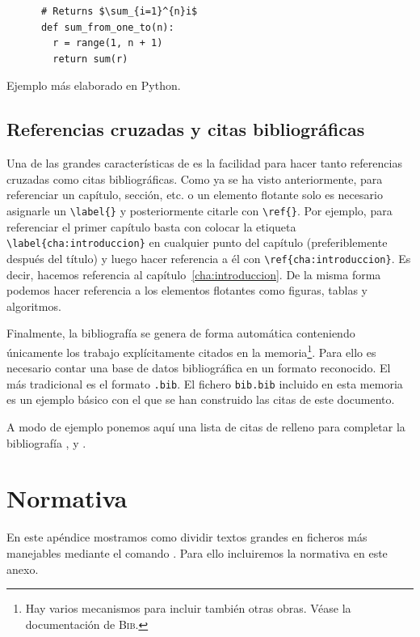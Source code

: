 \documentclass{DeustoFDP}
\begin{document}
\begin{listing}\centering
  \begin{minipage}{.4\textwidth}
    \begin{verbatim}
      # Returns $\sum_{i=1}^{n}i$
      def sum_from_one_to(n):
        r = range(1, n + 1)
        return sum(r)
    \end{verbatim}
  \end{minipage}
  \caption{Ejemplo m\'as elaborado en Python.}\label{lst:python}
\end{listing}

\section{Referencias cruzadas y citas bibliogr\'aficas}

Una de las grandes caracter\'isticas de  es la facilidad para
hacer tanto referencias cruzadas como citas bibliogr\'aficas. Como ya se ha
visto anteriormente, para referenciar un cap\'itulo, secci\'on, etc. o
un elemento flotante solo es necesario asignarle un \verb+\label{}+ y
posteriormente citarle con \verb+\ref{}+. Por ejemplo, para referenciar
el primer cap\'itulo basta con colocar la etiqueta
\verb+\label{cha:introduccion}+ en cualquier punto del cap\'itulo
(preferiblemente despu\'es del t\'itulo) y luego hacer referencia a \'el
con \verb+\ref{cha:introduccion}+. Es decir, hacemos referencia al
cap\'itulo~\ref{cha:introduccion}. De la misma forma podemos hacer referencia a
los elementos flotantes como figuras, tablas y algoritmos.

Finalmente, la bibliograf\'ia se genera de forma autom\'atica conteniendo
\'unicamente los trabajo expl\'icitamente citados en la
memoria\footnote{Hay varios mecanismos para incluir tambi\'en otras obras.
V\'ease la documentaci\'on de \textsc{Bib}.}. Para ello es necesario
contar una base de datos bibliogr\'afica en un formato reconocido. El m\'as
tradicional es el formato \texttt{.bib}. El fichero \texttt{bib.bib}
incluido en esta memoria es un ejemplo b\'asico con el que se han construido
las citas de este documento.

A modo de ejemplo ponemos aqu\'i una lista de citas de relleno para completar
la bibliograf\'ia \cite{article,conference,book}, \cite{phd} y \cite{master}.

\printbibliography[heading=bibintoc]

\appendix

\chapter{Normativa}\label{an:normativa}

En este ap\'endice mostramos como dividir textos grandes en ficheros m\'as
manejables mediante el comando \verb++. Para ello incluiremos la
normativa en este anexo.



\backmatter
\end{document}
